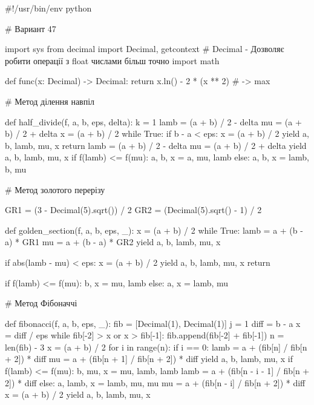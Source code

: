 \documentclass[14pt,a4paper]{extarticle}
\theoremstyle{definition}
\begin{document}
\begin{pythoncode}
#!/usr/bin/env python

# Вариант 47

import sys
from decimal import Decimal, getcontext
# Decimal - Дозволяє робити операції з float числами більш точно
import math

def func(x: Decimal) -> Decimal:
    return x.ln() - 2 * (x ** 2) # -> max

# Метод ділення навпіл

def half_divide(f, a, b, eps, delta):
    k = 1
    lamb = (a + b) / 2 - delta
    mu = (a + b) / 2 + delta
    x = (a + b) / 2
    while True:
        if b - a < eps:
            x = (a + b) / 2
            yield a, b, lamb, mu, x
            return
        lamb = (a + b) / 2 - delta
        mu = (a + b) / 2 + delta
        yield a, b, lamb, mu, x
        if f(lamb) <= f(mu):
            a, b, x = a, mu, lamb
        else:
            a, b, x = lamb, b, mu

# Метод золотого перерізу

GR1 = (3 - Decimal(5).sqrt()) / 2
GR2 = (Decimal(5).sqrt() - 1) / 2

def golden_section(f, a, b, eps, _):
    x = (a + b) / 2
    while True:
        lamb = a + (b - a) * GR1
        mu = a + (b - a) * GR2
        yield a, b, lamb, mu, x

        if abs(lamb - mu) < eps:
            x = (a + b) / 2
            yield a, b, lamb, mu, x
            return

        if f(lamb) <= f(mu):
            b, x = mu, lamb
        else:
            a, x = lamb, mu

# Метод Фібоначчі

def fibonacci(f, a, b, eps, _):
    fib = [Decimal(1), Decimal(1)]
    j = 1
    diff = b - a
    x = diff / eps
    while fib[-2] > x or x > fib[-1]:
        fib.append(fib[-2] + fib[-1])
    n = len(fib) - 3
    x = (a + b) / 2
    for i in range(n):
        if i == 0:
            lamb = a + (fib[n] / fib[n + 2]) * diff
            mu = a + (fib[n + 1] / fib[n + 2]) * diff
        yield a, b, lamb, mu, x
        if f(lamb) <= f(mu):
            b, mu, x = mu, lamb, lamb
            lamb = a + (fib[n - i - 1] / fib[n + 2]) * diff
        else:
            a, lamb, x = lamb, mu, mu
            mu = a + (fib[n - i] / fib[n + 2]) * diff
    x = (a + b) / 2
    yield a, b, lamb, mu, x



\end{pythoncode}
\end{document}
